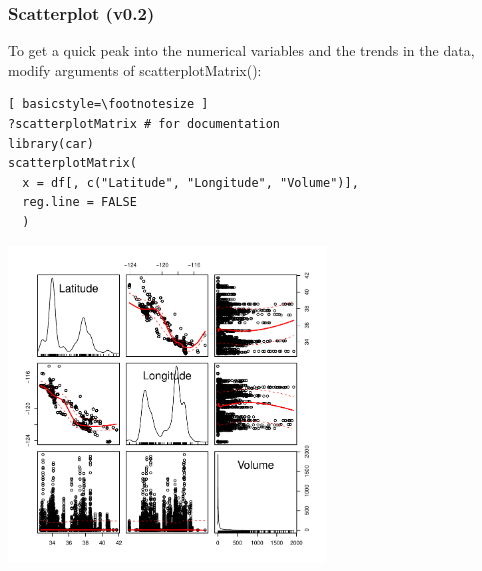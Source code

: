 \begin{frame}
\frametitle{Scatterplot (v0.2)}

To get a quick peak into the numerical variables and the trends in the data, modify arguments of \ttfamily scatterplotMatrix(): \normalfont
  		\begin{lstlisting}[ basicstyle=\footnotesize ]
?scatterplotMatrix # for documentation
library(car)		
scatterplotMatrix(
  x = df[, c("Latitude", "Longitude", "Volume")], 
  reg.line = FALSE
  )
		\end{lstlisting}

        \begin{center}
         \includegraphics[width=0.63\textwidth]{images/scatterPlot_v1.pdf}
        \end{center}
\end{frame}

